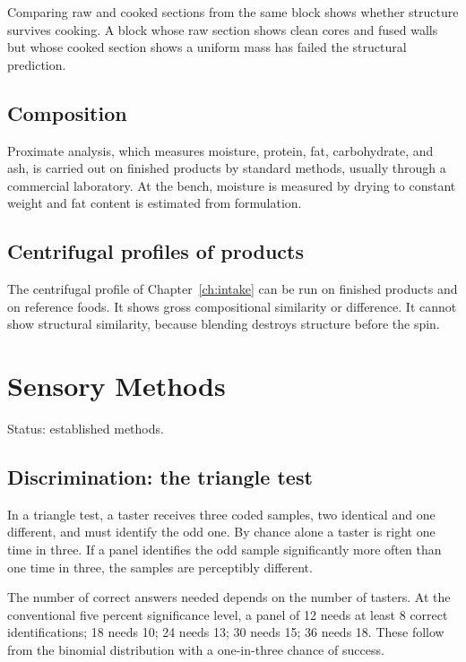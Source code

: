 \documentclass[11pt,openany]{book}
\theoremstyle{definition}
\begin{document}
Comparing raw and cooked sections from the same block shows whether structure survives cooking. A block whose raw section shows clean cores and fused walls but whose cooked section shows a uniform mass has failed the structural prediction.

\section{Composition}

Proximate analysis, which measures moisture, protein, fat, carbohydrate, and ash, is carried out on finished products by standard methods, usually through a commercial laboratory. At the bench, moisture is measured by drying to constant weight and fat content is estimated from formulation.

\section{Centrifugal profiles of products}

The centrifugal profile of Chapter~\ref{ch:intake} can be run on finished products and on reference foods. It shows gross compositional similarity or difference. It cannot show structural similarity, because blending destroys structure before the spin.

\chapter{Sensory Methods}\label{ch:sensory}

Status: established methods.

\section{Discrimination: the triangle test}

In a triangle test, a taster receives three coded samples, two identical and one different, and must identify the odd one. By chance alone a taster is right one time in three. If a panel identifies the odd sample significantly more often than one time in three, the samples are perceptibly different.

The number of correct answers needed depends on the number of tasters. At the conventional five percent significance level, a panel of 12 needs at least 8 correct identifications; 18 needs 10; 24 needs 13; 30 needs 15; 36 needs 18. These follow from the binomial distribution with a one-in-three chance of success.
\end{document}
